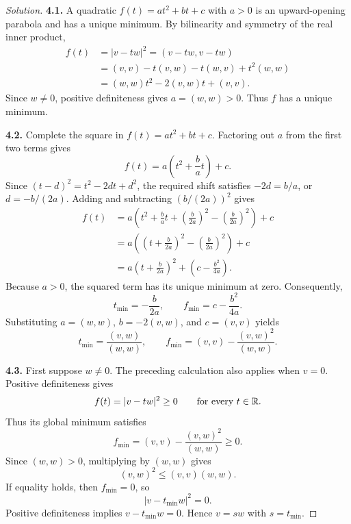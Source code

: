 \begin{proof}[Solution]
  \textbf{4.1.} A quadratic \(f(t)=at^2+bt+c\) with \(a>0\) is
  an upward-opening parabola and has a unique minimum. By bilinearity
  and symmetry of the real inner product,
  \[
    \begin{aligned}
      f(t)&=|v-tw|^2=(v-tw,v-tw)\\
        &=(v,v)-t(v,w)-t(w,v)+t^2(w,w)\\
        &=(w,w)t^2-2(v,w)t+(v,v).
    \end{aligned}
  \]
  Since \(w\ne0\), positive definiteness gives \(a=(w,w)>0\).
  Thus \(f\) has a unique minimum.

  \textbf{4.2.} Complete the square in \(f(t)=at^2+bt+c\). Factoring
  out \(a\) from the first two terms gives
  \[
    f(t)=a\left(t^2+\frac{b}{a}t\right)+c.
  \]
  Since \((t-d)^2=t^2-2dt+d^2\), the required shift satisfies
  \(-2d=b/a\), or \(d=-b/(2a)\). Adding and subtracting
  \((b/(2a))^2\) gives
  \[
    \begin{aligned}
      f(t)&=a\left(t^2+\frac{b}{a}t
        +\left(\frac{b}{2a}\right)^2
        -\left(\frac{b}{2a}\right)^2\right)+c\\
        &=a\left(\left(t+\frac{b}{2a}\right)^2
          -\left(\frac{b}{2a}\right)^2\right)+c\\
        &=a\left(t+\frac{b}{2a}\right)^2
          +\left(c-\frac{b^2}{4a}\right).
    \end{aligned}
  \]
  Because \(a>0\), the squared term has its unique minimum at zero.
  Consequently,
  \[
    t_{\min}=-\frac{b}{2a},\qquad
    f_{\min}=c-\frac{b^2}{4a}.
  \]
  Substituting \(a=(w,w)\), \(b=-2(v,w)\), and \(c=(v,v)\) yields
  \[
    t_{\min}=\frac{(v,w)}{(w,w)},\qquad
    f_{\min}=(v,v)-\frac{(v,w)^2}{(w,w)}.
  \]

  \textbf{4.3.} First suppose \(w\ne0\). The preceding calculation
  also applies when \(v=0\). Positive definiteness gives
  \[
    f(t)=|v-tw|^2\ge0\qquad\text{for every }t\in\mathbb{R}.
  \]
  Thus its global minimum satisfies
  \[
    f_{\min}=(v,v)-\frac{(v,w)^2}{(w,w)}\ge0.
  \]
  Since \((w,w)>0\), multiplying by \((w,w)\) gives
  \[
    (v,w)^2\le(v,v)(w,w).
  \]
  If equality holds, then \(f_{\min}=0\), so
  \[
    |v-t_{\min}w|^2=0.
  \]
  Positive definiteness implies \(v-t_{\min}w=0\). Hence
  \(v=sw\) with \(s=t_{\min}\).


\end{proof}
